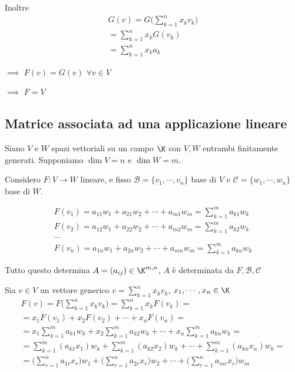 \documentclass[twoside, 11pt, titlepage]{article}
\begin{document}
{\begin{itemize}
	Inoltre
	\begin{multline*}
		G(v)=G\bigg(\sum_{k=1}^{n}x_{k} v_{k} \bigg)\\=\sum_{k=1}^{n}x_{k} G(v_{k})\\=\sum_{k=1}^{n}x_{k} a_{k} 
	\end{multline*} 
	
	$\implies$ $ F(v)=G(v) $ $ \forall v \in V $ 
	
	$\implies$ $F=V$
	\end{itemize}
}

\subsection{Matrice associata ad una applicazione lineare}

Siano $ V $ e $ W $ spazi vettoriali su un campo $ \K $ con $ V,W $ entrambi finitamente generati. Supponiamo $ \dim V =n$ e $ \dim W = m$.

Considero $ F:V\to W $ lineare, e fisso $ \mathscr{B}=\{v_{1}, \cdots, v_{n}  \} $ base di $ V $ e $ \mathscr{C}=\{w_{1}, \cdots, w_{n}  \} $ base di $ W $.

\begin{gather*}
F(v_{1} ) = a_{11} w_{1} + a_{21} w_2+ \cdots + a_{m1} w_{m}=\sum_{k=1}^m a_{k1} w_{k}   \\
F(v_{2} ) = a_{12} w_{1} + a_{22} w_2+ \cdots + a_{m2} w_{m}=\sum_{k=1}^m a_{k2} w_{k}\\
\cdots\\
F(v_{n} ) = a_{1n} w_{1} + a_{2n} w_2+ \cdots + a_{mn} w_{m}=\sum_{k=1}^m a_{kn} w_{k}
\end{gather*}

Tutto questo determina $ A=(a_{ij} ) \in \K^{m,n}$, $ A $ è determinata da $ F, \mathscr{B}, \mathscr{C} $

Sia $ v \in V $ un vettore generico $ v= \sum_{k=1}^n x_{k}v_{k}$, $ x_1, \cdots, x_{n} \in \K  $
\begin{multline*}
	F(v)=F\bigg(\sum_{k=1}^n x_{k}v_{k}\bigg)=\sum_{k=1}^n x_{k}F(v_{k})=\\
	=x_1F(v_1)+x_2F(v_2)+ \cdots + x_{n}F(v_{n} ) =\\
	=x_1\sum_{k=1}^m a_{k1} w_{k}+x_2\sum_{k=1}^m a_{k2} w_{k}+ \cdots + x_{n}\sum_{k=1}^m a_{kn} w_{k}=\\
	=\sum_{k=1}^m (a_{k1} x_1) w_{k}+\sum_{k=1}^m (a_{k2} x_2) w_{k}+ \cdots + \sum_{k=1}^m (a_{kn} x_{n})  w_{k}=\\
	=\bigg(\sum_{r=1}^n a_{1r} x_{r}  \bigg) w_1+\bigg(\sum_{r=1}^n a_{2r} x_{r}  \bigg) w_2 + \cdots + \bigg(\sum_{r=1}^n a_{mr} x_{r}  \bigg) w_m
\end{multline*}
\end{document}
